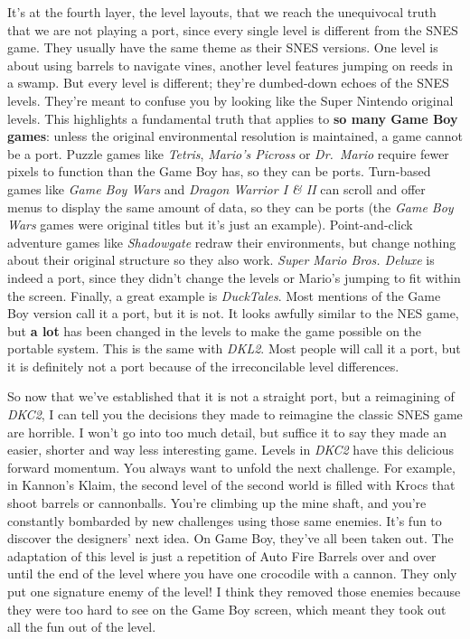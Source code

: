 \documentclass{book}
\begin{document}
It’s at the fourth layer, the level layouts, that we reach the unequivocal truth that we are not playing a port, since every single level is different from the SNES game. They usually have the same theme as their SNES versions. One level is about using barrels to navigate vines, another level features jumping on reeds in a swamp. But every level is different; they’re dumbed-down echoes of the SNES levels. They’re meant to confuse you by looking like the Super Nintendo original levels. This highlights a fundamental truth that applies to \textbf{so many Game Boy games}: unless the original environmental resolution is maintained, a game cannot be a port. Puzzle games like \emph{Tetris}, \emph{Mario’s Picross} or \emph{Dr.~Mario} require fewer pixels to function than the Game Boy has, so they can be ports. Turn-based games like \emph{Game Boy Wars} and \emph{Dragon Warrior I \& II} can scroll and offer menus to display the same amount of data, so they can be ports (the \emph{Game Boy Wars} games were original titles but it’s just an example). Point-and-click adventure games like \emph{Shadowgate} redraw their environments, but change nothing about their original structure so they also work. \emph{Super Mario Bros. Deluxe} is indeed a port, since they didn’t change the levels or Mario’s jumping to fit within the screen. Finally, a great example is \emph{DuckTales}. Most mentions of the Game Boy version call it a port, but it is not. It looks awfully similar to the NES game, but \textbf{a lot} has been changed in the levels to make the game possible on the portable system. This is the same with \emph{DKL2}. Most people will call it a port, but it is definitely not a port because of the irreconcilable level differences.\par
So now that we’ve established that it is not a straight port, but a reimagining of \emph{DKC2}, I can tell you the decisions they made to reimagine the classic SNES game are horrible. I won’t go into too much detail, but suffice it to say they made an easier, shorter and way less interesting game. Levels in \emph{DKC2} have this delicious forward momentum. You always want to unfold the next challenge. For example, in Kannon’s Klaim, the second level of the second world is filled with Krocs that shoot barrels or cannonballs. You’re climbing up the mine shaft, and you’re constantly bombarded by new challenges using those same enemies. It’s fun to discover the designers’ next idea. On Game Boy, they’ve all been taken out. The adaptation of this level is just a repetition of Auto Fire Barrels over and over until the end of the level where you have one crocodile with a cannon. They only put one signature enemy of the level! I think they removed those enemies because they were too hard to see on the Game Boy screen, which meant they took out all the fun out of the level.\par
\end{document}
